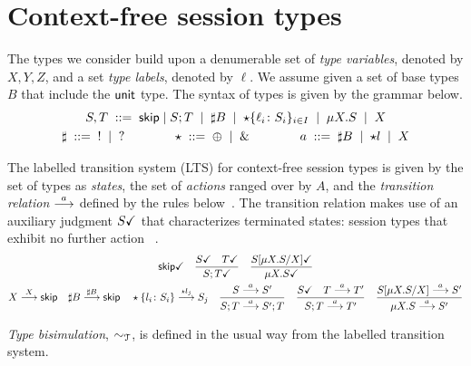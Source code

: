 \section{Context-free session types}
\label{sec:contextfreesession}

The types we consider build upon a denumerable set of \emph{type
  variables}, denoted by $X,Y,Z$, and a set \emph{type labels},
denoted by $\ell$. We assume given a set of base types $B$ that
include the $\unitk$ type. The syntax of types is given by the grammar
below.
%
\begin{gather*}
  S,T \grmeq \skipk \mid S;T \grmor \sharp B \grmor 
  \star\{\ell_i\colon S_i\}_{i\in I} \grmor \mu X.S \grmor X
  \\
  \sharp \grmeq {}! \grmor {}? 
  \qquad \qquad
  \star  \grmeq \oplus \grmor {}\&
  \qquad \qquad
  a \grmeq \sharp B \grmor \star l \grmor X
\end{gather*}

%
The labelled transition system (LTS) for context-free session types is
given by the set of types as \emph{states}, the set of \emph{actions}
ranged over by $A$, and the \emph{transition relation} $\LTSderives$
defined by the rules below~\cite{thiemann2016context}.
The transition relation makes
use of an auxiliary judgment $\DONE{S}$ that characterizes terminated
states: session types that exhibit no further
action~\cite{DBLP:journals/jacm/AcetoH92} .
%
  \begin{gather*}
    \DONE{\skipk}
    \quad
    \frac{\DONE{S} \quad \DONE{T}}{\DONE{S; T}}
    \quad
    \frac{\DONE{S[\mu X.S/X]}}{\DONE{\mu X.S}}
    \\
    X \LTSderives[X] \skipk
    \quad
    \sharp B \LTSderives[\sharp B] \skipk
    \quad
    \star\{l_i\colon S_i\} \LTSderives[\star l_j] S_j
    \quad
    \frac{S \LTSderives S'}{S; T \LTSderives S';T}
    \quad
    \frac{\DONE{S} \quad T \LTSderives T'}{S; T \LTSderives T'}
    \quad
    \frac{S[\mu X.S/X] \LTSderives S'}{\mu X.S \LTSderives S'}
  \end{gather*}


\emph{Type bisimulation}, $\TypeEquiv$, is defined in the usual way from the
labelled transition system. 

